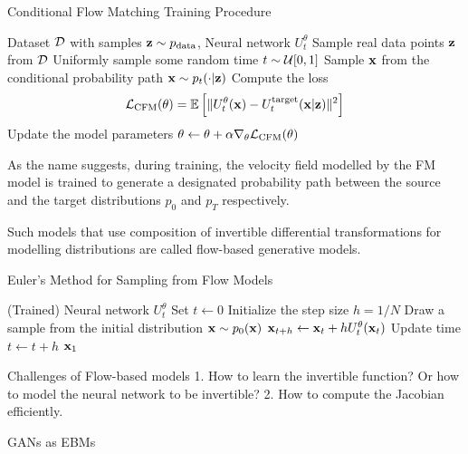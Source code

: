 \documentclass[a4paper, 11pt]{article}
\begin{document}
\begin{algorithm}
    \caption{Conditional Flow Matching Training Procedure}\label{alg:fm_train}
    \begin{algorithmic}[1]
    \Require Dataset $\mbox{${\cal D}$}$ with samples $\mbox{$\mbox{$\mathbf{z}$}$} \sim p_{\text{data}}$, Neural network $U_t^{\theta}$
    \State Sample real data points $\mbox{$\mbox{$\mathbf{z}$}$}$ from $\mbox{${\cal D}$}$
    \State Uniformly sample some random time $t \sim \mbox{${\cal U}$}[0, 1]$
    \State Sample $\mbox{$\mbox{$\mathbf{x}$}$}$ from the conditional probability path $\mbox{$\mbox{$\mathbf{x}$}$} \sim p_t(\cdot | \mbox{$\mbox{$\mathbf{z}$}$})$
    \State Compute the loss
    \begin{align*}
        \mbox{${\cal L}$}_{\text{CFM}}(\theta) = \mathbb{E} \left [ \|U_t^{\theta}(\mbox{$\mbox{$\mathbf{x}$}$}) - U_t^{\text{target}}(\mbox{$\mbox{$\mathbf{x}$}$} | \mbox{$\mbox{$\mathbf{z}$}$}) \|^2 \right ]
    \end{align*}
    \State Update the model parameters $\theta \gets \theta + \alpha \nabla_{\theta} \mbox{${\cal L}$}_{\text{CFM}}(\theta)$
    \EndWhile
    \end{algorithmic}
\end{algorithm}
    


As the name suggests, during training, the velocity field modelled by the FM model is trained to generate a designated probability path between the source and the target distributions $p_0$ and $p_T$ respectively.


Such models that use composition of invertible differential transformations for modelling distributions are called flow-based generative models.


\begin{algorithm}
    \caption{Euler's Method for Sampling from Flow Models}\label{alg:fm_sample}
    \begin{algorithmic}[1]
    \Require (Trained) Neural network $U_t^{\theta}$
    \State Set $t \gets 0$
    \State Initialize the step size $h = 1 / N$
    \State Draw a sample from the initial distribution $\mbox{$\mbox{$\mathbf{x}$}$} \sim p_0(\mbox{$\mbox{$\mathbf{x}$}$})$
    \State $\mbox{$\mbox{$\mathbf{x}$}$}_{t+h} \gets \mbox{$\mbox{$\mathbf{x}$}$}_t + h U_t^{\theta}(\mbox{$\mbox{$\mathbf{x}$}$}_t)$
    \State Update time $t \gets t + h$
    \EndFor
    \State \Return $\mbox{$\mbox{$\mathbf{x}$}$}_1$
    \end{algorithmic}
\end{algorithm}


Challenges of Flow-based models 1. How to learn the invertible function? Or how to model the neural network to be invertible? 2. How to compute the Jacobian efficiently.


GANs as EBMs
\end{document}
